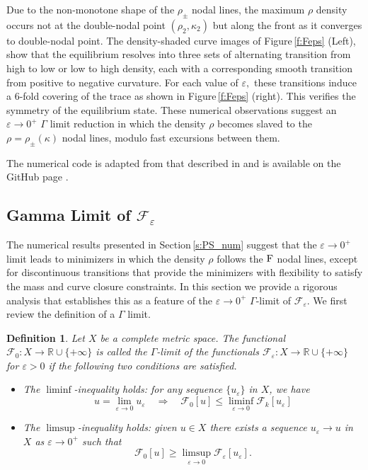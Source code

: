 \documentclass[11pt]{amsart}
\theoremstyle{plain}
\def\cF{{\mathcal F}}
\def\mbbR{\mathbb{R}}
\def\mrF{\textrm F}
\def\eps{\varepsilon}
\def\cF{{\mathcal F}}
\numberwithin{equation}{section}
\theoremstyle{plain}
\newtheorem{definition}[thm]{Definition}
\begin{document}
Due to the non-monotone shape of the $\rho_\pm$ nodal lines, the maximum $\rho$ density occurs not at the double-nodal point $(\rho_2,\kappa_2)$ but along the front as it converges to double-nodal point. The density-shaded curve images of Figure\,\ref{f:Feps} (Left), show that the equilibrium resolves into three sets of alternating transition from high to low or low to high density, each with a corresponding smooth transition from positive to negative curvature. For each value of $\eps,$ these transitions induce a 6-fold covering of the trace as shown in Figure\,\ref{f:Feps} (right). This verifies the  symmetry of the equilibrium state. These numerical observations suggest an $\eps\to0^+$ $\Gamma$ limit reduction in which the density $\rho$ becomes slaved to the $\rho=\rho_\pm(\kappa)$ nodal lines, modulo fast excursions between them.

The numerical code is adapted from that described in \cite{NPW_25} and is available on the GitHub page \cite{WGHub_25}.

\subsection{Gamma Limit of $\cF_\eps$}
\label{s:Gamma}
The numerical results presented in Section\,\ref{s:PS_num} suggest that the $\eps\to0^+$ limit leads to minimizers in which the density $\rho$ follows the $\mrF$ nodal lines, except for  discontinuous transitions that provide the minimizers with flexibility to satisfy the mass and curve closure constraints. In this section we provide a rigorous analysis that establishes this as a feature of the $\eps\to0^+$  $\Gamma$-limit of $\cF_\eps.$ We first review the definition of a $\Gamma$ limit.
\begin{definition}\label{def:Gamma-conv}
Let $X$ be a complete metric space. The functional $\cF_0:X\rightarrow \mbbR\cup\{+\infty\}$ is called the $\Gamma$-limit of the functionals $\cF_\eps:X\rightarrow\mbbR\cup\{+\infty\}$ for $\eps>0$ if the following two conditions are satisfied.
\begin{itemize}
    \item The $\liminf$-inequality holds: for any sequence $\{u_\eps\}$ in $X$, we have
    \begin{equation}\label{eq:liminf-ineq}
    u =  \lim\limits_{\eps\rightarrow 0}{u_\eps} \quad  \Longrightarrow  \quad 
        \cF_0[u]\leq \liminf_{\eps\rightarrow 0}{\cF_k[u_\eps]}
    \end{equation}
    \item The $\limsup$-inequality holds: given $u\in X$ there exists a sequence $u_\eps\longrightarrow u$ in $X$ as $\eps\rightarrow 0^+$ such that
\begin{equation}\label{eq:limsup-ineq}
    \cF_0[u]\geq \limsup_{\eps\rightarrow 0}{\cF_\eps[u_\eps]}.
\end{equation}
\end{itemize}
\end{definition}
\end{document}
